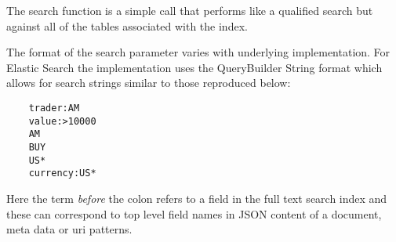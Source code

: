 The search function is a simple call that performs like a qualified search but against
all of the tables associated with the index.

The format of the search parameter varies with underlying implementation. For
Elastic Search the implementation uses the QueryBuilder String format which allows
for search strings similar to those reproduced below:

\begin{Verbatim}
	trader:AM
	value:>10000
	AM
	BUY
	US*
	currency:US*
\end{Verbatim}

Here the term \emph{before} the colon refers to a field in the full text search
index and these can correspond to top level field names in JSON content of a
document, meta data or uri patterns.
